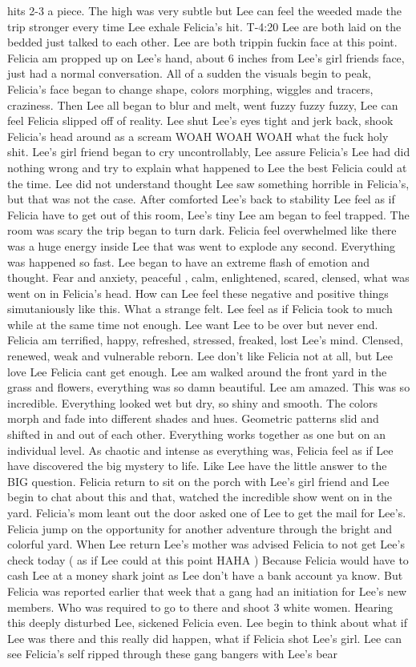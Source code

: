 \documentclass[12pt]{book}
\begin{document}
hits 2-3 a piece. The high was very subtle but Lee can feel the weeded made the trip stronger every time Lee exhale Felicia's hit. T-4:20 Lee are both laid on the bedded just talked to each other. Lee are both trippin fuckin face at this point. Felicia am propped up on Lee's hand, about 6 inches from Lee's girl friends face, just had a normal conversation. All of a sudden the visuals begin to peak, Felicia's face began to change shape, colors morphing, wiggles and tracers, craziness. Then Lee all began to blur and melt, went fuzzy fuzzy fuzzy, Lee can feel Felicia slipped off of reality. Lee shut Lee's eyes tight and jerk back, shook Felicia's head around as a scream WOAH WOAH WOAH what the fuck holy shit. Lee's girl friend began to cry uncontrollably, Lee assure Felicia's Lee had did nothing wrong and try to explain what happened to Lee the best Felicia could at the time. Lee did not understand thought Lee saw something horrible in Felicia's, but that was not the case. After comforted Lee's back to stability Lee feel as if Felicia have to get out of this room, Lee's tiny Lee am began to feel trapped. The room was scary the trip began to turn dark. Felicia feel overwhelmed like there was a huge energy inside Lee that was went to explode any second. Everything was happened so fast. Lee began to have an extreme flash of emotion and thought. Fear and anxiety, peaceful , calm, enlightened, scared, clensed, what was went on in Felicia's head. How can Lee feel these negative and positive things simutaniously like this. What a strange felt. Lee feel as if Felicia took to much while at the same time not enough. Lee want Lee to be over but never end. Felicia am terrified, happy, refreshed, stressed, freaked, lost Lee's mind. Clensed, renewed, weak and vulnerable reborn. Lee don't like Felicia not at all, but Lee love Lee Felicia cant get enough. Lee am walked around the front yard in the grass and flowers, everything was so damn beautiful. Lee am amazed. This was so incredible. Everything looked wet but dry, so shiny and smooth. The colors morph and fade into different shades and hues. Geometric patterns slid and shifted in and out of each other. Everything works together as one but on an individual level. As chaotic and intense as everything was, Felicia feel as if Lee have discovered the big mystery to life. Like Lee have the little answer to the BIG question. Felicia return to sit on the porch with Lee's girl friend and Lee begin to chat about this and that, watched the incredible show went on in the yard. Felicia's mom leant out the door asked one of Lee to get the mail for Lee's. Felicia jump on the opportunity for another adventure through the bright and colorful yard. When Lee return Lee's mother was advised Felicia to not get Lee's check today ( as if Lee could at this point HAHA ) Because Felicia would have to cash Lee at a money shark joint as Lee don't have a bank account ya know. But Felicia was reported earlier that week that a gang had an initiation for Lee's new members. Who was required to go to there and shoot 3 white women. Hearing this deeply disturbed Lee, sickened Felicia even. Lee begin to think about what if Lee was there and this really did happen, what if Felicia shot Lee's girl. Lee can see Felicia's self ripped through these gang bangers with Lee's bear 
\end{document}
